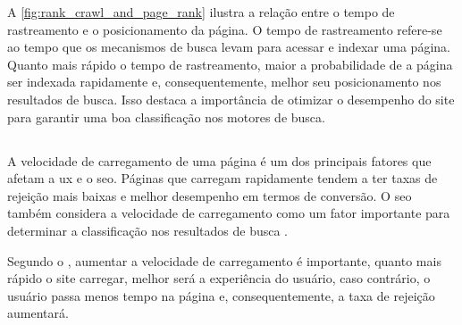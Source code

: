 A \autoref{fig:rank_crawl_and_page_rank} ilustra a relação entre o tempo de rastreamento e o posicionamento da página. O tempo de rastreamento refere-se ao tempo que os mecanismos de busca levam para acessar e indexar uma página. Quanto mais rápido o tempo de rastreamento, maior a probabilidade de a página ser indexada rapidamente e, consequentemente, melhor seu posicionamento nos resultados de busca. Isso destaca a importância de otimizar o desempenho do site para garantir uma boa classificação nos motores de busca.



\subsection{ }
\label{sec:velocidade da página}
A velocidade de carregamento de uma página é um dos principais fatores que afetam a \acrshort{ux} e o \acrshort{seo}. Páginas que carregam rapidamente tendem a ter taxas de rejeição mais baixas e melhor desempenho em termos de conversão. O \acrshort{seo} também considera a velocidade de carregamento como um fator importante para determinar a classificação nos resultados de busca \cite{conor2022}.

Segundo o , aumentar a velocidade de carregamento é importante, quanto mais rápido o site carregar, melhor será a experiência do usuário, caso contrário, o usuário passa menos tempo na página e, consequentemente, a taxa de rejeição aumentará. 
